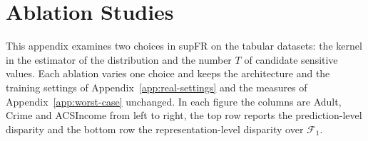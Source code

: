 \documentclass{article} %
\begin{document}


\section{Ablation Studies}
\label{app:ablation-studies}

This appendix examines two choices in supFR on the tabular datasets: the kernel in the estimator of the distribution and the number $T$ of candidate sensitive values. 
Each ablation varies one choice and keeps the architecture and the training settings of Appendix~\ref{app:real-settings} and the measures of Appendix~\ref{app:worst-case} unchanged.  In each figure the columns are Adult, Crime and ACSIncome from left to right, the top row reports the prediction-level disparity and the bottom row the representation-level disparity over $\mathcal{F}_1$.
\end{document}

